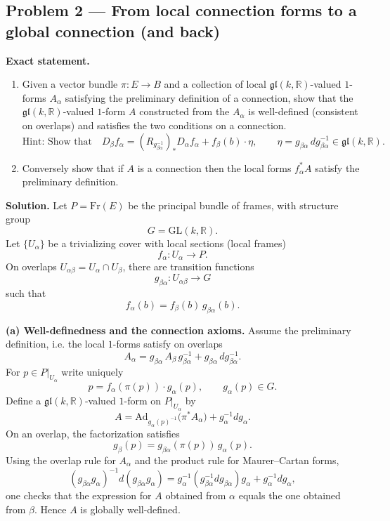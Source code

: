 \documentclass[12pt,a4paper]{article}
\theoremstyle{plain}
\theoremstyle{definition}      %
\begin{document}
\subsection*{Problem 2 — From local connection forms to a global connection (and back)}

\textbf{Exact statement.}
\begin{enumerate}[label=(\alph*)]
	\item Given a vector bundle $\pi:E\to B$ and a collection of local $\mathfrak{gl}(k,\mathbb{R})$-valued $1$-forms $A_\alpha$
	satisfying the preliminary definition of a connection, show that the $\mathfrak{gl}(k,\mathbb{R})$-valued $1$-form $A$
	constructed from the $A_\alpha$ is well-defined (consistent on overlaps) and satisfies the two conditions on a connection.
	\[
	\text{Hint: Show that}\quad
	D_\beta f_\alpha
	=
	(R_{g_{\beta\alpha}^{-1}})_*D_\alpha f_\alpha
	+
	f_\beta(b)\cdot\eta,
	\qquad
	\eta=g_{\beta\alpha}\,dg_{\beta\alpha}^{-1}\in\mathfrak{gl}(k,\mathbb{R}).
	\]
	\item Conversely show that if $A$ is a connection then the local forms $f_\alpha^*A$ satisfy the preliminary definition.
\end{enumerate}

\textbf{Solution.}
Let $P=\mathrm{Fr}(E)$ be the principal bundle of frames, with structure group
\[
G=\mathrm{GL}(k,\mathbb{R}).
\]
Let $\{U_\alpha\}$ be a trivializing cover with local sections (local frames)
\[
f_\alpha:U_\alpha\longrightarrow P.
\]
On overlaps $U_{\alpha\beta}=U_\alpha\cap U_\beta$, there are transition functions
\[
g_{\beta\alpha}:U_{\alpha\beta}\longrightarrow G
\]
such that
\[
f_\alpha(b)=f_\beta(b)\,g_{\beta\alpha}(b).
\]

\textbf{(a) Well-definedness and the connection axioms.}
Assume the preliminary definition, i.e. the local $1$-forms satisfy on overlaps
\[
A_\alpha
=
g_{\beta\alpha}\,A_\beta\,g_{\beta\alpha}^{-1}
+
g_{\beta\alpha}\,dg_{\beta\alpha}^{-1}.
\]
For $p\in P|_{U_\alpha}$ write uniquely
\[
p=f_\alpha(\pi(p))\cdot g_\alpha(p),
\qquad
g_\alpha(p)\in G.
\]
Define a $\mathfrak{gl}(k,\mathbb{R})$-valued $1$-form on $P|_{U_\alpha}$ by
\[
A
=
\mathrm{Ad}_{g_\alpha(p)^{-1}}\bigl(\pi^*A_\alpha\bigr)
+
g_\alpha^{-1}dg_\alpha.
\]
On an overlap, the factorization satisfies
\[
g_\beta(p)=g_{\beta\alpha}(\pi(p))\,g_\alpha(p).
\]
Using the overlap rule for $A_\alpha$ and the product rule for Maurer--Cartan forms,
\[
(g_{\beta\alpha}g_\alpha)^{-1}d(g_{\beta\alpha}g_\alpha)
=
g_\alpha^{-1}(g_{\beta\alpha}^{-1}dg_{\beta\alpha})g_\alpha
+
g_\alpha^{-1}dg_\alpha,
\]
one checks that the expression for $A$ obtained from $\alpha$ equals the one obtained from $\beta$. Hence $A$ is globally well-defined.
\end{document}
